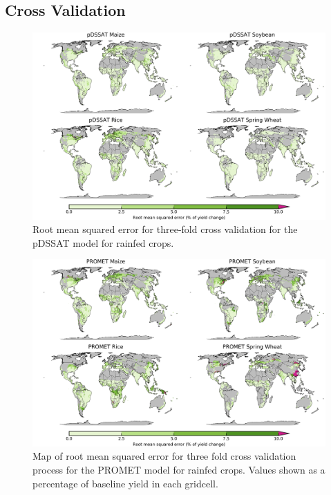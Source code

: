 \documentclass[10pt]{article}
\begin{document}
\clearpage
\subsection{Cross Validation}

\begin{figure}[h!]
\centering
\includegraphics[width=15.5cm]{pDSSAT_spatial_MSE_ton_ha.png}
\caption{Root mean squared error for three-fold cross validation for the pDSSAT model for rainfed crops.}
\label{fig:pdssatrmse}
\end{figure}

\begin{figure}[h!]
\centering
\includegraphics[width=15.5cm]{PROMET_spatial_MSE_ton_ha.png}
\caption{Map of root mean squared error for three fold cross validation process for the PROMET model for rainfed crops. Values shown as a percentage of baseline yield in each gridcell.}
\label{fig:pdssatrmse}
\end{figure}
\end{document}
